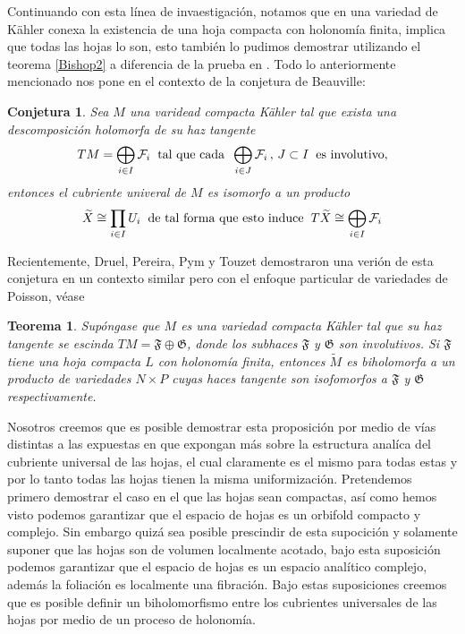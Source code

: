 \documentclass[letterpaper]{report}
\newtheorem{teorema}{Teorema}[chapter]
\newtheorem{conjetura}{Conjetura}
\begin{document}
Continuando con esta l\'inea de invaestigaci\'on, notamos que en una variedad de K\"ahler conexa la existencia de una hoja compacta 
con holonom\'ia finita, implica que todas las hojas lo son, esto tambi\'en lo pudimos demostrar utilizando el teorema \ref{Bishop2} a 
diferencia de la prueba en \cite{Pereira}. Todo lo anteriormente mencionado nos pone en el contexto de la conjetura de Beauville:
\begin{conjetura}
        Sea $M$ una varidead compacta K\"ahler tal que exista una descomposici\'on holomorfa de su haz tangente
        \[
        TM=\bigoplus_{i\in I}\mathcal{F}_i\hspace{0.2cm}\text{tal que cada}\hspace{0.2cm}\bigoplus_{i\in J}\mathcal{F}_i\,,\,J\subset I\hspace{0.2cm}\text{es involutivo},
        \]
        entonces el cubriente univeral de $M$ es isomorfo a un producto 
        \[
        \widetilde{X}\cong\prod_{i\in I}U_i\hspace{0.2cm}\text{de tal forma que esto induce}\hspace{0.2cm}T\widetilde{X}\cong\bigoplus_{i\in I}\mathcal{F}_i
        \]
\end{conjetura}
Recientemente, Druel, Pereira, Pym y Touzet demostraron una veri\'on de esta conjetura en un contexto similar pero con el enfoque
particular de variedades de Poisson, v\'ease \cite{DPPT}
\begin{teorema}
        Sup\'ongase que $M$ es una variedad compacta K\"ahler tal que su haz tangente se escinda $TM=\mathfrak{F}\oplus\mathfrak{G}$, donde
        los subhaces $\mathfrak{F}$ y $\mathfrak{G}$ son involutivos. Si $\mathfrak{F}$ tiene una hoja compacta $L$ con holonom\'ia finita,
        entonces $\widetilde{M}$ es biholomorfa a un producto de variedades $N\times P$ cuyas haces tangente son isofomorfos
        a $\mathfrak{F}$ y $\mathfrak{G}$ respectivamente.
\end{teorema}
\noindent Nosotros creemos que es posible demostrar esta proposici\'on por medio de v\'ias distintas a las expuestas en \cite{DPPT} que 
expongan m\'as sobre la estructura anal\'ica del cubriente universal de las hojas, el cual claramente es el mismo para todas estas
y por lo tanto todas las hojas tienen la misma uniformizaci\'on.
Pretendemos primero demostrar el caso en el que las hojas sean compactas, as\'i como hemos visto podemos garantizar que el espacio de
hojas es un orbifold compacto y complejo. Sin embargo quiz\'a sea posible prescindir de esta supocici\'on y solamente suponer que las hojas son
de volumen localmente acotado, bajo esta suposici\'on podemos garantizar que el espacio de hojas es un espacio anal\'itico complejo, adem\'as
la foliaci\'on es localmente una fibraci\'on. Bajo estas suposiciones creemos que es posible definir un biholomorfismo entre los cubrientes
universales de las hojas por medio de un proceso de holonom\'ia.
\end{document}
